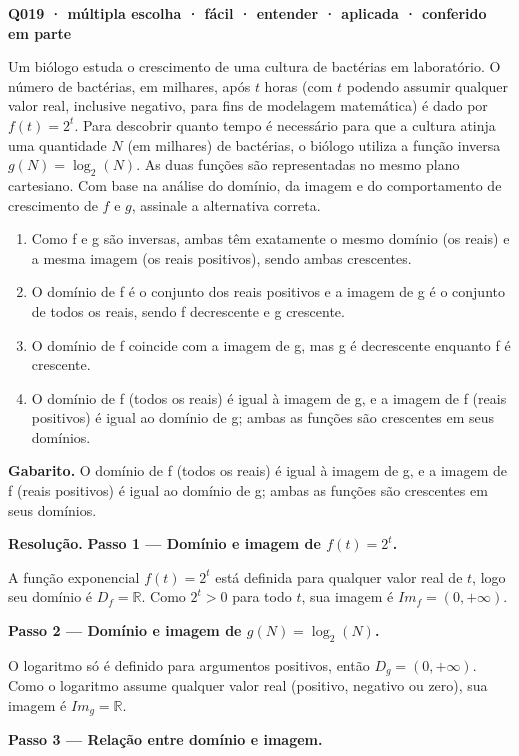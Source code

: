 \documentclass[11pt,a4paper]{article}
\begin{document}
\bigskip\noindent\textbf{Q019 · múltipla escolha · fácil · entender · aplicada · conferido em parte}\par\nopagebreak
Um biólogo estuda o crescimento de uma cultura de bactérias em laboratório. O número de bactérias, em milhares, após $t$ horas (com $t$ podendo assumir qualquer valor real, inclusive negativo, para fins de modelagem matemática) é dado por $f(t) = 2^t$. Para descobrir quanto tempo é necessário para que a cultura atinja uma quantidade $N$ (em milhares) de bactérias, o biólogo utiliza a função inversa $g(N) = \log_2(N)$. As duas funções são representadas no mesmo plano cartesiano. Com base na análise do domínio, da imagem e do comportamento de crescimento de $f$ e $g$, assinale a alternativa correta.
\begin{enumerate}[label=(\alph*)]
\item Como f e g são inversas, ambas têm exatamente o mesmo domínio (os reais) e a mesma imagem (os reais positivos), sendo ambas crescentes.
\item O domínio de f é o conjunto dos reais positivos e a imagem de g é o conjunto de todos os reais, sendo f decrescente e g crescente.
\item O domínio de f coincide com a imagem de g, mas g é decrescente enquanto f é crescente.
\item O domínio de f (todos os reais) é igual à imagem de g, e a imagem de f (reais positivos) é igual ao domínio de g; ambas as funções são crescentes em seus domínios.
\end{enumerate}

\textbf{Gabarito.} O domínio de f (todos os reais) é igual à imagem de g, e a imagem de f (reais positivos) é igual ao domínio de g; ambas as funções são crescentes em seus domínios.

\textbf{Resolução.} \textbf{Passo 1 — Domínio e imagem de $f(t) = 2^t$.}

A função exponencial $f(t) = 2^t$ está definida para qualquer valor real de $t$, logo seu domínio é $D_f = \mathbb{R}$. Como $2^t > 0$ para todo $t$, sua imagem é $Im_f = (0, +\infty)$.

\textbf{Passo 2 — Domínio e imagem de $g(N) = \log_2(N)$.}

O logaritmo só é definido para argumentos positivos, então $D_g = (0, +\infty)$. Como o logaritmo assume qualquer valor real (positivo, negativo ou zero), sua imagem é $Im_g = \mathbb{R}$.

\textbf{Passo 3 — Relação entre domínio e imagem.}
\end{document}

